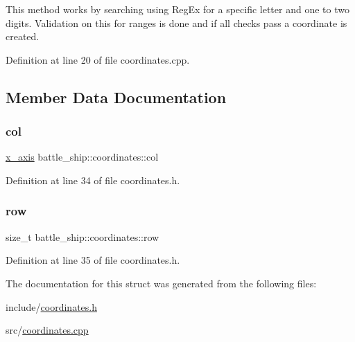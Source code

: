 This method works by searching using Reg\+Ex for a specific letter and one to two digits. Validation on this for ranges is done and if all checks pass a coordinate is created. 

Definition at line 20 of file coordinates.\+cpp.



\subsection{Member Data Documentation}
\mbox{\label{structbattle__ship_1_1coordinates_acda28ed24b163de319f6431762db3a72}} 
\subsubsection{\texorpdfstring{col}{col}}
{\footnotesize\ttfamily \hyperlink{namespacebattle__ship_ab3bfa90e413692dac2d4463364f80561}{x\+\_\+axis} battle\+\_\+ship\+::coordinates\+::col}



Definition at line 34 of file coordinates.\+h.

\mbox{\label{structbattle__ship_1_1coordinates_a68c97ae4b9f30e2d5f20f3727546a29b}} 
\subsubsection{\texorpdfstring{row}{row}}
{\footnotesize\ttfamily size\+\_\+t battle\+\_\+ship\+::coordinates\+::row}



Definition at line 35 of file coordinates.\+h.



The documentation for this struct was generated from the following files\+:\begin{DoxyCompactItemize}
\item 
include/\hyperlink{coordinates_8h}{coordinates.\+h}\item 
src/\hyperlink{coordinates_8cpp}{coordinates.\+cpp}\end{DoxyCompactItemize}
